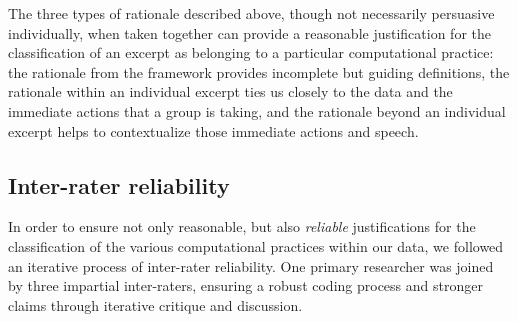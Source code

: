 \documentclass{msuphddissertation}
\begin{document}
\begin{doublespace}
The three types of rationale described above, though not necessarily persuasive individually, when taken together can provide a reasonable justification for the classification of an excerpt as belonging to a particular computational practice: the rationale from the framework provides incomplete but guiding definitions, the rationale within an individual excerpt ties us closely to the data and the immediate actions that a group is taking, and the rationale beyond an individual excerpt helps to contextualize those immediate actions and speech.

\subsection{Inter-rater reliability}

In order to ensure not only reasonable, but also \textit{reliable} justifications for the classification of the various computational practices within our data, we followed an iterative process of inter-rater reliability.  One primary researcher was joined by three impartial inter-raters, ensuring a robust coding process and stronger claims through iterative critique and discussion.


\end{doublespace}
\end{document}

